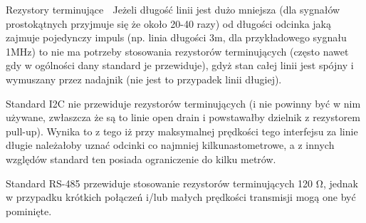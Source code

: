 \begin{ProTip}[breakable]{Rezystory terminujące {\Symbola 🤔}}
Jeżeli długość linii jest dużo mniejsza (dla sygnałów prostokątnych przyjmuje się że około 20-40 razy) od długości odcinka jaką zajmuje pojedynczy impuls (np. linia długości 3m, dla przykładowego sygnału 1MHz)
to nie ma potrzeby stosowania rezystorów terminujących (często nawet gdy w ogólności dany standard je przewiduje), gdyż stan całej linii jest spójny i wymuszany przez nadajnik (nie jest to przypadek linii długiej).

\vspace{7pt}

Standard I2C nie przewiduje rezystorów terminujących (i nie powinny być w nim używane, zwłaszcza że są to linie open drain i powstawałby dzielnik z rezystorem pull-up).
Wynika to z tego iż przy maksymalnej prędkości tego interfejsu za linie długie należałoby uznać odcinki co najmniej kilkunastometrowe, a z innych względów standard ten posiada ograniczenie do kilku metrów.

Standard RS-485 przewiduje stosowanie rezystorów terminujących 120 Ω, jednak w przypadku krótkich połączeń i/lub małych prędkości transmisji mogą one być pominięte.
\end{ProTip}
